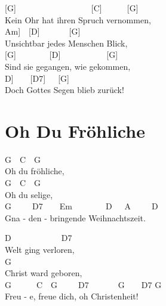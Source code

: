 \documentclass[
  letterpaper,
]{scrbook}
\begin{document}
{[}G{]}~~~~~~~~~~~~~~~~~~{[}C{]}~~~~~~{[}G{]}\\
Kein Ohr hat ihren Spruch vernommen,\\
\hspace*{0.333em}\hspace*{0.333em}\hspace*{0.333em}\hspace*{0.333em}\hspace*{0.333em}\hspace*{0.333em}\hspace*{0.333em}\hspace*{0.333em}\hspace*{0.333em}\hspace*{0.333em}\hspace*{0.333em}{[}Am{]}~~{[}D{]}~~~~~~~{[}G{]}\\
Unsichtbar jedes Menschen Blick,\\
{[}G{]}~~~~~~~~{[}D{]}~~~~~~~~~~~{[}G{]}\\
Sind sie gegangen, wie gekommen,\\
\hspace*{0.333em}\hspace*{0.333em}\hspace*{0.333em}\hspace*{0.333em}\hspace*{0.333em}\hspace*{0.333em}\hspace*{0.333em}\hspace*{0.333em}\hspace*{0.333em}\hspace*{0.333em}\hspace*{0.333em}\hspace*{0.333em}{[}D{]}~~~~{[}D7{]}~~~{[}G{]}\\
Doch Gottes Segen blieb zurück!

\hypertarget{oh-du-fruxf6hliche}{%
\chapter{Oh Du Fröhliche}\label{oh-du-fruxf6hliche}}

G~~C~~G\\
Oh du fröhliche,\\
G~~C~~G\\
Oh du selige,\\
G~~~~~D7~~~~Em~~~~~~~~D~~~A~~~~~D\\
Gna - den - bringende Weihnachtszeit.

D~~~~~~~~~~~~D7\\
Welt ging verloren,\\
G\\
Christ ward geboren,\\
G~~~~~~C~~G~~~~~D7~~~~~~~G~~~~D7 G\\
Freu - e, freue dich, oh Christenheit!
\end{document}
